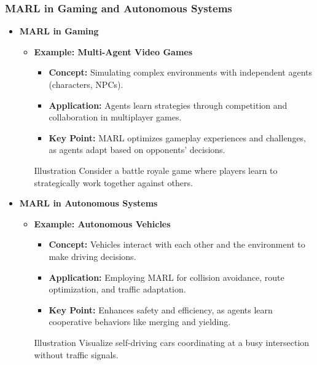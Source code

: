 \documentclass[aspectratio=169]{beamer}
\begin{document}
\begin{frame}[fragile]
    \frametitle{MARL in Gaming and Autonomous Systems}
    \begin{itemize}
        \item \textbf{MARL in Gaming}
        \begin{itemize}
            \item \textbf{Example: Multi-Agent Video Games}
            \begin{itemize}
                \item \textbf{Concept:} Simulating complex environments with independent agents (characters, NPCs).
                \item \textbf{Application:} Agents learn strategies through competition and collaboration in multiplayer games.
                \item \textbf{Key Point:} MARL optimizes gameplay experiences and challenges, as agents adapt based on opponents' decisions.
            \end{itemize}
            \begin{block}{Illustration}
                Consider a battle royale game where players learn to strategically work together against others.
            \end{block}
        \end{itemize}

        \item \textbf{MARL in Autonomous Systems}
        \begin{itemize}
            \item \textbf{Example: Autonomous Vehicles}
            \begin{itemize}
                \item \textbf{Concept:} Vehicles interact with each other and the environment to make driving decisions.
                \item \textbf{Application:} Employing MARL for collision avoidance, route optimization, and traffic adaptation.
                \item \textbf{Key Point:} Enhances safety and efficiency, as agents learn cooperative behaviors like merging and yielding.
            \end{itemize}
            \begin{block}{Illustration}
                Visualize self-driving cars coordinating at a busy intersection without traffic signals.
            \end{block}
        \end{itemize}
    \end{itemize}
\end{frame}
\end{document}
